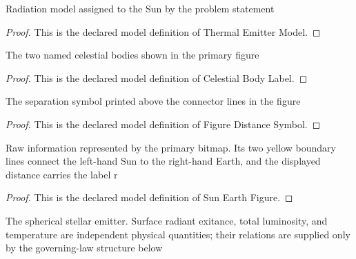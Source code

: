 \begin{definition}
  \label{def:physics:phyx-mini-0489:phyxminiproblems-problemphyxmini0489-thermalemittermodel}
  Radiation model assigned to the Sun by the problem statement
\end{definition}
\begin{proof}
  This is the declared model definition of Thermal Emitter Model.
\end{proof}
\begin{definition}
  \label{def:physics:phyx-mini-0489:phyxminiproblems-problemphyxmini0489-celestialbodylabel}
  The two named celestial bodies shown in the primary figure
\end{definition}
\begin{proof}
  This is the declared model definition of Celestial Body Label.
\end{proof}
\begin{definition}
  \label{def:physics:phyx-mini-0489:phyxminiproblems-problemphyxmini0489-figuredistancesymbol}
  The separation symbol printed above the connector lines in the figure
\end{definition}
\begin{proof}
  This is the declared model definition of Figure Distance Symbol.
\end{proof}
\begin{definition}
  \label{def:physics:phyx-mini-0489:phyxminiproblems-problemphyxmini0489-sunearthfigure}
  Raw information represented by the primary bitmap. Its two yellow boundary lines connect the left-hand Sun to the right-hand Earth, and the displayed distance carries the label r
\end{definition}
\begin{proof}
  This is the declared model definition of Sun Earth Figure.
\end{proof}
\begin{definition}
  \label{def:physics:phyx-mini-0489:phyxminiproblems-problemphyxmini0489-sphericalstellaremitter}
  The spherical stellar emitter. Surface radiant exitance, total luminosity, and temperature are independent physical quantities; their relations are supplied only by the governing-law structure below
\end{definition}
